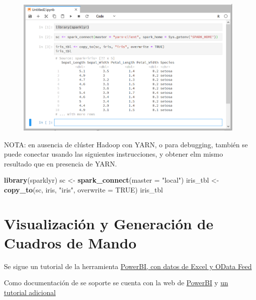\documentclass[]{book}
\newenvironment{Shaded}{\begin{snugshade}}{\end{snugshade}}
\newcommand{\KeywordTok}[1]{\textcolor[rgb]{0.13,0.29,0.53}{\textbf{#1}}}
\newcommand{\DataTypeTok}[1]{\textcolor[rgb]{0.13,0.29,0.53}{#1}}
\newcommand{\StringTok}[1]{\textcolor[rgb]{0.31,0.60,0.02}{#1}}
\newcommand{\OtherTok}[1]{\textcolor[rgb]{0.56,0.35,0.01}{#1}}
\newcommand{\NormalTok}[1]{#1}
\begin{document}
\begin{figure}
\centering
\includegraphics{images/T3-sparklyr3.png}
\caption{}
\end{figure}

NOTA: en ausencia de clúster Hadoop con YARN, o para debugging, también
se puede conectar usando las siguientes instrucciones, y obtener elm
mismo resultado que en presencia de YARN.

\begin{Shaded}
\begin{Highlighting}[]
\KeywordTok{library}\NormalTok{(sparklyr)}
\NormalTok{sc <-}\StringTok{ }\KeywordTok{spark_connect}\NormalTok{(}\DataTypeTok{master =} \StringTok{"local"}\NormalTok{)}
\NormalTok{iris_tbl <-}\StringTok{ }\KeywordTok{copy_to}\NormalTok{(sc, iris, }\StringTok{"iris"}\NormalTok{, }\DataTypeTok{overwrite =} \OtherTok{TRUE}\NormalTok{)}
\NormalTok{iris_tbl}
\end{Highlighting}
\end{Shaded}

\section{Visualización y Generación de Cuadros de
Mando}\label{visualizaciuxf3n-y-generaciuxf3n-de-cuadros-de-mando}

Se sigue un tutorial de la herramienta
\href{https://docs.microsoft.com/es-es/power-bi/desktop-tutorial-analyzing-sales-data-from-excel-and-an-odata-feed}{PowerBI,
con datos de Excel y OData Feed}

Como documentación de se soporte se cuenta con la web de
\href{https://docs.microsoft.com/es-es/power-bi/}{PowerBI} y
\href{https://ccance.net/manuales/powerbi/capitulo_01_introduccion.pdf}{un
tutorial adicional}
\end{document}
